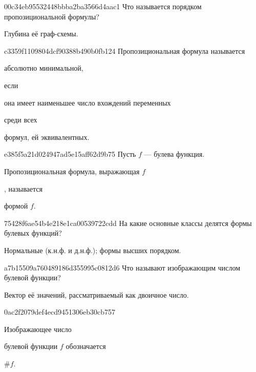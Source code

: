 \begin{note}{00c34eb95532448bbba2ba3566d4aac1}
    Что называется порядком пропозициональной формулы?

    \begin{cloze}{1}
        Глубина её граф-схемы.
    \end{cloze}
\end{note}

\begin{note}{c3359f1109804dcf90388b490b0fb124}
    Пропозициональная формула называется \begin{icloze}{3}абсолютно минимальной,\end{icloze} если \begin{icloze}{2}она имеет наименьшее число вхождений переменных\end{icloze} среди всех \begin{icloze}{1}формул, ей эквивалентных.\end{icloze}
\end{note}

\begin{note}{e385f5a21d024947ad5e15aff62d9b75}
    Пусть \({ f }\) --- булева функция.
    \begin{icloze}{2}Пропозициональная формула, выражающая \({ f }\)\end{icloze}, называется \begin{icloze}{1}формой \({ f }\).\end{icloze}
\end{note}

\begin{note}{75428f6ae54b4e218e1ca00539722cdd}
    На какие основные классы делятся формы булевых функций?

    \begin{cloze}{1}
        Нормальные (к.н.ф. и д.н.ф.); формы высших порядком.
    \end{cloze}
\end{note}

\begin{note}{a7b15509a760489186d355995c0812d6}
    Что называют изображающим числом булевой функции?

    \begin{cloze}{1}
        Вектор её значений, рассматриваемый как двоичное число.
    \end{cloze}
\end{note}

\begin{note}{0ac2f2079def4ecd9451306eb30cb757}
    \begin{icloze}{2}Изображающее число\end{icloze} булевой функции \({ f }\) обозначается \begin{icloze}{1}\({ \# f }\).\end{icloze}
\end{note}

